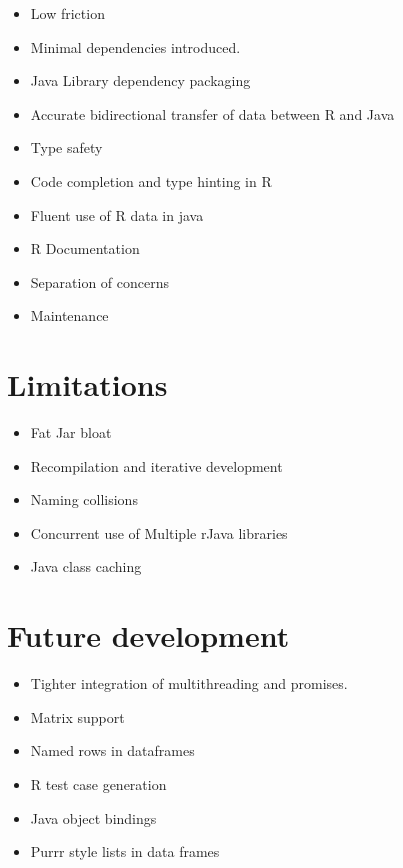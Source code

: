 \begin{itemize}
\tightlist
\item
  Low friction
\item
  Minimal dependencies introduced.
\item
  Java Library dependency packaging
\item
  Accurate bidirectional transfer of data between R and Java
\item
  Type safety
\item
  Code completion and type hinting in R
\item
  Fluent use of R data in java
\item
  R Documentation
\item
  Separation of concerns
\item
  Maintenance
\end{itemize}

\hypertarget{limitations}{%
\section{Limitations}\label{limitations}}

\begin{itemize}
\tightlist
\item
  Fat Jar bloat
\item
  Recompilation and iterative development
\item
  Naming collisions
\item
  Concurrent use of Multiple rJava libraries
\item
  Java class caching
\end{itemize}

\hypertarget{future-development}{%
\section{Future development}\label{future-development}}

\begin{itemize}
\tightlist
\item
  Tighter integration of multithreading and promises.
\item
  Matrix support
\item
  Named rows in dataframes
\item
  R test case generation
\item
  Java object bindings
\item
  Purrr style lists in data frames
\end{itemize}

